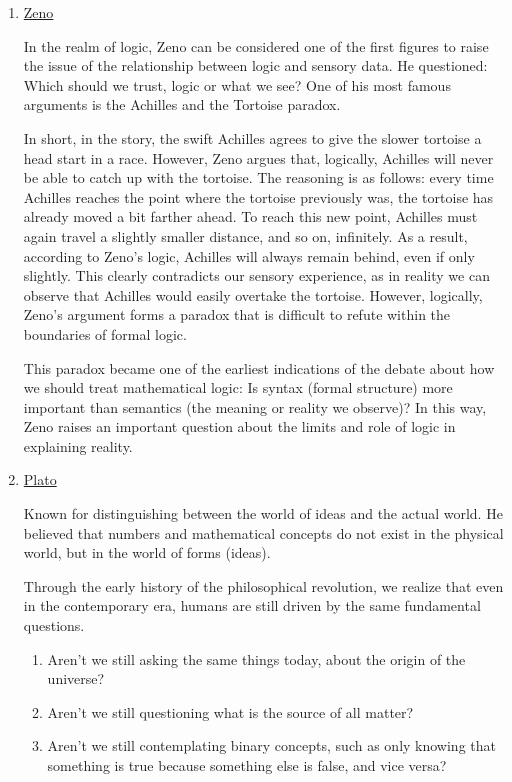 \documentclass[12pt,a4paper,openany]{article}
\begin{document}
\begin{enumerate}
\item \href{https://simple.wikipedia.org/wiki/Zeno_of_Elea}{Zeno} 
 
In the realm of logic, Zeno can be considered one of the first figures to raise the issue of the relationship between logic and sensory data. He questioned: 
Which should we trust, logic or what we see? One of his most famous arguments is the Achilles and the Tortoise paradox.

In short, in the story, the swift Achilles agrees to give the slower tortoise a head start in a race.
However, Zeno argues that, logically, Achilles will never be able to catch up with the tortoise. The reasoning is as follows: every time Achilles reaches the point where the tortoise previously was, 
the tortoise has already moved a bit farther ahead. To reach this new point, 
Achilles must again travel a slightly smaller distance, and so on, infinitely. 
As a result, according to Zeno's logic, Achilles will always remain behind, even if only slightly. This clearly contradicts our sensory experience, 
as in reality we can observe that Achilles would easily overtake the tortoise. However, logically, Zeno's argument forms a paradox that is difficult to refute within the boundaries of formal logic.

This paradox became one of the earliest indications of the debate about how we should treat mathematical logic: Is syntax (formal structure) more important than semantics (the meaning or reality we observe)? In this way, 
Zeno raises an important question about the limits and role of logic in explaining reality.

\item \href{https://simple.wikipedia.org/wiki/Plato}{Plato}

Known for distinguishing between the world of ideas and the actual world. 
He believed that numbers and mathematical concepts do not exist in the physical world, but in the world of forms (ideas).

Through the early history of the philosophical revolution, we realize that even in the contemporary era,
humans are still driven by the same fundamental questions.

\begin{enumerate}
    \item Aren't we still asking the same things today, about the origin of the universe?
    \item Aren't we still questioning what is the source of all matter?
    \item Aren't we still contemplating binary concepts, such as only knowing that something is true because something else is false, and vice versa?
\end{enumerate}


\end{enumerate}
\end{document}
